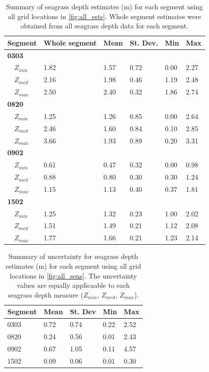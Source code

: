 \documentclass[letterpaper,12pt,oneside]{article}\usepackage[]{graphicx}\usepackage[]{color}
\begin{document}
\begin{table}[!tbp]
\caption{Summary of seagrass depth estimates (m) for each segment using all grid locations in \cref{fig:all_ests}.  Whole segment estimates were obtained from all seagrass depth data for each segment.\label{tab:est_summ}} 
\begin{center}
\begin{tabular}{llllll}
\hline\hline
\multicolumn{1}{l}{{\bf Segment}}&\multicolumn{1}{c}{Whole segment}&\multicolumn{1}{c}{Mean}&\multicolumn{1}{c}{St. Dev.}&\multicolumn{1}{c}{Min}&\multicolumn{1}{c}{Max}\tabularnewline
\hline
{\bfseries 0303}&&&&&\tabularnewline
~~$Z_{min}$&1.82&1.57&0.72&0.00&2.27\tabularnewline
~~$Z_{med}$&2.16&1.98&0.46&1.19&2.48\tabularnewline
~~$Z_{max}$&2.50&2.40&0.32&1.86&2.74\tabularnewline
\hline
{\bfseries 0820}&&&&&\tabularnewline
~~$Z_{min}$&1.25&1.26&0.85&0.00&2.64\tabularnewline
~~$Z_{med}$&2.46&1.60&0.84&0.10&2.85\tabularnewline
~~$Z_{max}$&3.66&1.93&0.89&0.20&3.31\tabularnewline
\hline
{\bfseries 0902}&&&&&\tabularnewline
~~$Z_{min}$&0.61&0.47&0.32&0.00&0.98\tabularnewline
~~$Z_{med}$&0.88&0.80&0.30&0.30&1.24\tabularnewline
~~$Z_{max}$&1.15&1.13&0.40&0.37&1.81\tabularnewline
\hline
{\bfseries 1502}&&&&&\tabularnewline
~~$Z_{min}$&1.25&1.32&0.23&1.00&2.02\tabularnewline
~~$Z_{med}$&1.51&1.49&0.21&1.12&2.08\tabularnewline
~~$Z_{max}$&1.77&1.66&0.21&1.23&2.14\tabularnewline
\hline
\end{tabular}\end{center}

\end{table}


\begin{table}[!tbp]
\caption{Summary of uncertainty for seagrass depth estimates (m) for each segment using all grid locations in \cref{fig:all_sens}.  The uncertainty values are equally applicaable to each seagrass depth measure ($Z_{min}$, $Z_{med}$, $Z_{max}$).\label{tab:sens_summ}} 
\begin{center}
\begin{tabular}{lllll}
\hline\hline
\multicolumn{1}{l}{Segment}&\multicolumn{1}{c}{Mean}&\multicolumn{1}{c}{St. Dev}&\multicolumn{1}{c}{Min}&\multicolumn{1}{c}{Max}\tabularnewline
\hline
0303&0.72&0.74&0.22&2.52\tabularnewline
0820&0.24&0.56&0.01&2.43\tabularnewline
0902&0.67&1.05&0.11&4.57\tabularnewline
1502&0.09&0.06&0.01&0.30\tabularnewline
\hline
\end{tabular}\end{center}

\end{table}
\end{document}
